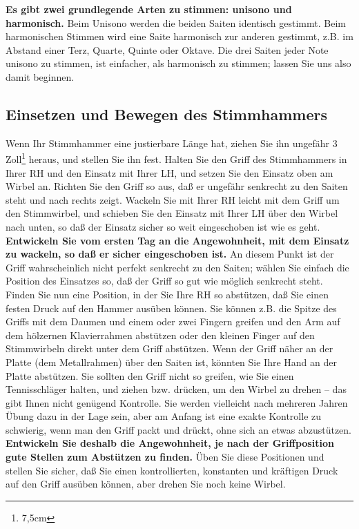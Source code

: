 \textbf{Es gibt zwei grundlegende Arten zu stimmen: unisono und harmonisch.}
Beim Unisono werden die beiden Saiten identisch gestimmt.
Beim harmonischen Stimmen wird eine Saite harmonisch zur anderen gestimmt, z.B. im Abstand einer Terz, Quarte, Quinte oder Oktave.
Die drei Saiten jeder Note unisono zu stimmen, ist einfacher, als harmonisch zu stimmen; lassen Sie uns also damit beginnen.
 

\label{c2_5b}
\subsection{Einsetzen und Bewegen des Stimmhammers}
\label{c2_5_hamm} 

Wenn Ihr Stimmhammer eine justierbare Länge hat, ziehen Sie ihn ungefähr 3 Zoll\footnote{7,5cm} heraus, und stellen Sie ihn fest.
Halten Sie den Griff des Stimmhammers in Ihrer RH und den Einsatz mit Ihrer LH, und setzen Sie den Einsatz oben am Wirbel an.
Richten Sie den Griff so aus, daß er ungefähr senkrecht zu den Saiten steht und nach rechts zeigt.
Wackeln Sie mit Ihrer RH leicht mit dem Griff um den Stimmwirbel, und schieben Sie den Einsatz mit Ihrer LH über den Wirbel nach unten, so daß der Einsatz sicher so weit eingeschoben ist wie es geht.
\textbf{Entwickeln Sie vom ersten Tag an die Angewohnheit, mit dem Einsatz zu wackeln, so daß er sicher eingeschoben ist.}
An diesem Punkt ist der Griff wahrscheinlich nicht perfekt senkrecht zu den Saiten; wählen Sie einfach die Position des Einsatzes so, daß der Griff so gut wie möglich senkrecht steht.
Finden Sie nun eine Position, in der Sie Ihre RH so abstützen, daß Sie einen festen Druck auf den Hammer ausüben können.
Sie können z.B. die Spitze des Griffs mit dem Daumen und einem oder zwei Fingern greifen und den Arm auf dem hölzernen Klavierrahmen abstützen oder den kleinen Finger auf den Stimmwirbeln direkt unter dem Griff abstützen.
Wenn der Griff näher an der Platte (dem Metallrahmen) über den Saiten ist, könnten Sie Ihre Hand an der Platte abstützen.
Sie sollten den Griff nicht so greifen, wie Sie einen Tennisschläger halten, und ziehen bzw. drücken, um den Wirbel zu drehen -- das gibt Ihnen nicht genügend Kontrolle.
Sie werden vielleicht nach mehreren Jahren Übung dazu in der Lage sein, aber am Anfang ist eine exakte Kontrolle zu schwierig, wenn man den Griff packt und drückt, ohne sich an etwas abzustützen.
\textbf{Entwickeln Sie deshalb die Angewohnheit, je nach der Griffposition gute Stellen zum Abstützen zu finden.}
Üben Sie diese Positionen und stellen Sie sicher, daß Sie einen kontrollierten, konstanten und kräftigen Druck auf den Griff ausüben können, aber drehen Sie noch keine Wirbel.

